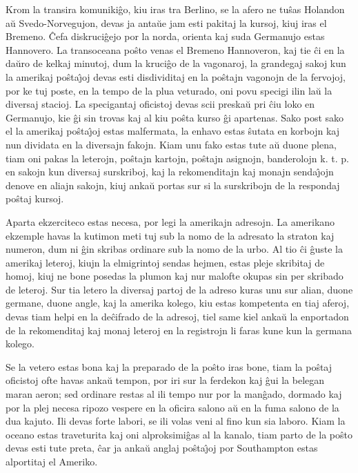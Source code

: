    Krom la transira komuniki\^go, kiu iras tra Berlino, se la afero
ne tu\^sas Holandon a\u u Svedo-Norvegujon, devas ja anta\u ue jam
esti pakitaj la kursoj, kiuj iras el Bremeno. \^Cefa diskruci\^gejo
por la norda, orienta kaj suda Germanujo estas Hannovero. La
transoceana po\^sto venas el Bremeno Hannoveron, kaj tie \^ci en la
da\u uro de kelkaj minutoj, dum la kruci\^go de la vagonaroj, la
grandegaj sakoj kun la amerikaj po\^sta\^{\j}oj devas esti
disdividitaj en la po\^stajn vagonojn de la fervojoj, por ke tuj
poste, en la tempo de la plua veturado, oni povu specigi ilin la\u u
la diversaj stacioj. La specigantaj oficistoj devas scii preska\u u
pri \^ciu loko en Germanujo, kie \^gi sin trovas kaj al kiu po\^sta
kurso \^gi apartenas. Sako post sako el la amerikaj po\^sta\^{\j}oj
estas malfermata, la enhavo estas \^sutata en korbojn kaj nun
dividata en la diversajn fakojn. Kiam unu fako estas tute a\u u
duone plena, tiam oni pakas la leterojn, po\^stajn kartojn,
po\^stajn asignojn, banderolojn k. t. p. en sakojn kun diversaj
surskriboj, kaj la rekomenditajn kaj monajn senda\^{\j}ojn denove en
aliajn sakojn, kiuj anka\u u portas sur si la surskribojn de la
respondaj po\^staj kursoj.

   Aparta ekzerciteco estas necesa, por legi la amerikajn adresojn. La
a\-me\-ri\-ka\-no ekzemple havas la kutimon meti tuj sub la nomo de
la adresato la straton kaj numeron, dum ni \^gin skribas ordinare
sub la nomo de la urbo. Al tio \^ci \^guste la amerikaj leteroj,
kiujn la elmigrintoj sendas hejmen, estas pleje skribitaj de homoj,
kiuj ne bone posedas la plumon kaj nur malofte okupas sin per
skribado de leteroj. Sur tia letero la diversaj partoj de la adreso
kuras unu sur alian, duone germane, duone angle, kaj la amerika
kolego, kiu estas kompetenta en tiaj aferoj, devas tiam helpi en la
de\^cifrado de la adresoj, tiel same kiel anka\u u la enportadon de
la rekomenditaj kaj monaj leteroj en la registrojn li faras kune kun
la germana kolego.

   Se la vetero estas bona kaj la preparado de la po\^sto iras bone, tiam
la po\^staj oficistoj ofte havas anka\u u tempon, por iri sur la
ferdekon kaj \^gui la belegan maran aeron; sed ordinare restas al
ili tempo nur por la man\^gado, dormado kaj por la plej necesa
ripozo vespere en la oficira salono a\u u en la fuma salono de la
dua kajuto. Ili devas forte labori, se ili volas veni al fino kun
sia laboro. Kiam la oceano estas traveturita kaj oni alproksimi\^gas
al la kanalo, tiam parto de la po\^sto devas esti tute preta, \^car
ja anka\u u anglaj po\^sta\^{\j}oj por Southampton estas alportitaj
el Ameriko.


